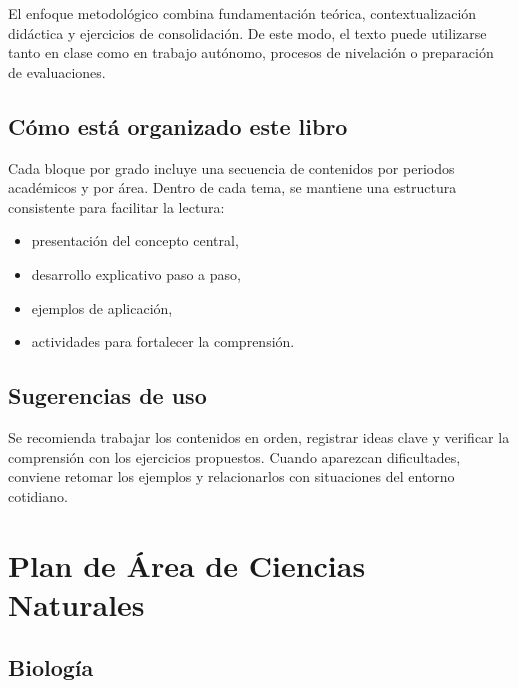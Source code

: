 \documentclass[
  spanish,
  letterpaper,
  12pt,
  oneside,
  open=any]{scrbook}
\providecommand{\tightlist}{%
  \setlength{\itemsep}{0pt}\setlength{\parskip}{0pt}}
\begin{document}
El enfoque metodológico combina fundamentación teórica,
contextualización didáctica y ejercicios de consolidación. De este modo,
el texto puede utilizarse tanto en clase como en trabajo autónomo,
procesos de nivelación o preparación de evaluaciones.

\section{Cómo está organizado este
libro}\label{cuxf3mo-estuxe1-organizado-este-libro}

Cada bloque por grado incluye una secuencia de contenidos por periodos
académicos y por área. Dentro de cada tema, se mantiene una estructura
consistente para facilitar la lectura:

\begin{itemize}
\tightlist
\item
  presentación del concepto central,
\item
  desarrollo explicativo paso a paso,
\item
  ejemplos de aplicación,
\item
  actividades para fortalecer la comprensión.
\end{itemize}

\section{Sugerencias de uso}\label{sugerencias-de-uso}

Se recomienda trabajar los contenidos en orden, registrar ideas clave y
verificar la comprensión con los ejercicios propuestos. Cuando aparezcan
dificultades, conviene retomar los ejemplos y relacionarlos con
situaciones del entorno cotidiano.

\chapter{Plan de Área de Ciencias
Naturales}\label{plan-de-uxe1rea-de-ciencias-naturales}

\section{Biología}\label{biologuxeda}
\end{document}
